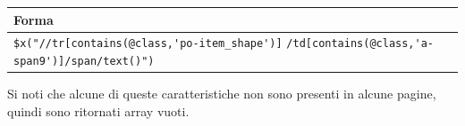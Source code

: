 \begin{table}[h!]
    \begin{tabularx}{\textwidth}{|X|}
        \hline
        \textbf{Forma} \\
        \hline
        \verb|$x("//tr[contains(@class,'po-item_shape')]|
        \newline
        \verb|/td[contains(@class,'a-span9')]/span/text()")|\\
        \hline
    \end{tabularx}
\label{tab:my_label}
\end{table}
\newpage
Si noti che alcune di queste caratteristiche non sono presenti in alcune pagine, quindi sono ritornati array vuoti.



